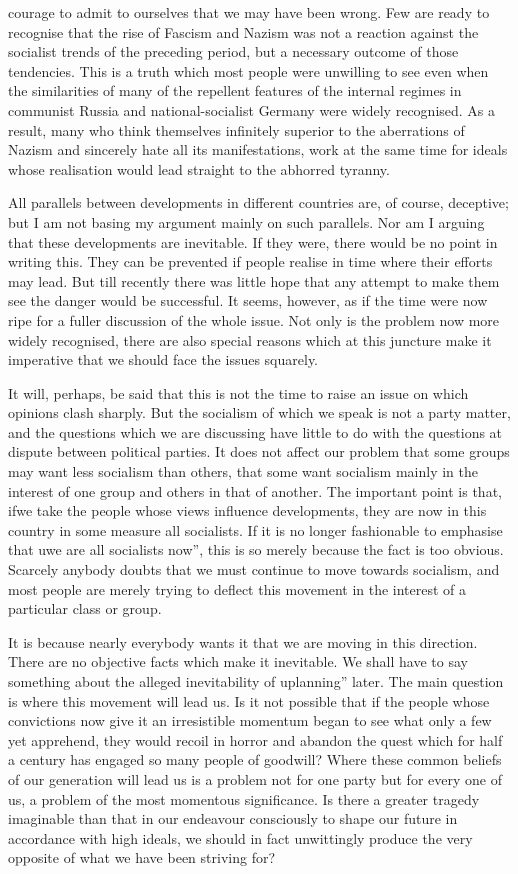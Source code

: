\documentclass[11pt,openany]{book}
\begin{document}
courage to admit to ourselves that we may have been wrong. Few are ready to recognise that the rise of Fascism and Nazism was not a reaction against the socialist trends of the preceding period, but a necessary outcome of those tendencies. This is a truth which most people were unwilling to see even when the similarities of many of the repellent features of the internal regimes in communist Russia and national-socialist Germany were widely recognised. As a result, many who think themselves infinitely superior to the aberrations of Nazism and sincerely hate all its manifestations, work at the same time for ideals whose realisation would lead straight to the abhorred tyranny.

All parallels between developments in different countries are, of course, deceptive; but I am not basing my argument mainly on such parallels. Nor am I arguing that these developments are inevitable. If they were, there would be no point in writing this. They can be prevented if people realise in time where their efforts may lead. But till recently there was little hope that any attempt to make them see the danger would be successful. It seems, however, as if the time were now ripe for a fuller discussion of the whole issue. Not only is the problem now more widely recognised, there are also special reasons which at this juncture make it imperative that we should face the issues squarely.

It will, perhaps, be said that this is not the time to raise an issue on which opinions clash sharply. But the socialism of which we speak is not a party matter, and the questions which we are discussing have little to do with the questions at dispute between political parties. It does not affect our problem that some groups may want less socialism than others, that some want socialism mainly in the interest of one group and others in that of another. The important point is that, ifwe take the people whose views influence developments, they are now in this country in some measure all socialists. If it is no longer fashionable to emphasise that uwe are all socialists now'', this is so merely because the fact is too obvious. Scarcely anybody doubts that we must continue to move towards socialism, and most people are merely trying to deflect this movement in the interest of a particular class or group.

It is because nearly everybody wants it that we are moving in this direction. There are no objective facts which make it inevitable. We shall have to say something about the alleged inevitability of uplanning'' later. The main question is where this movement will lead us. Is it not possible that if the people whose convictions now give it an irresistible momentum began to see what only a few yet apprehend, they would recoil in horror and abandon the quest which for half a century has engaged so many people of goodwill? Where these common beliefs of our generation will lead us is a problem not for one party but for every one of us, a problem of the most momentous significance. Is there a greater tragedy imaginable than that in our endeavour consciously to shape our future in accordance with high ideals, we should in fact unwittingly produce the very opposite of what we have been striving for?
\end{document}
